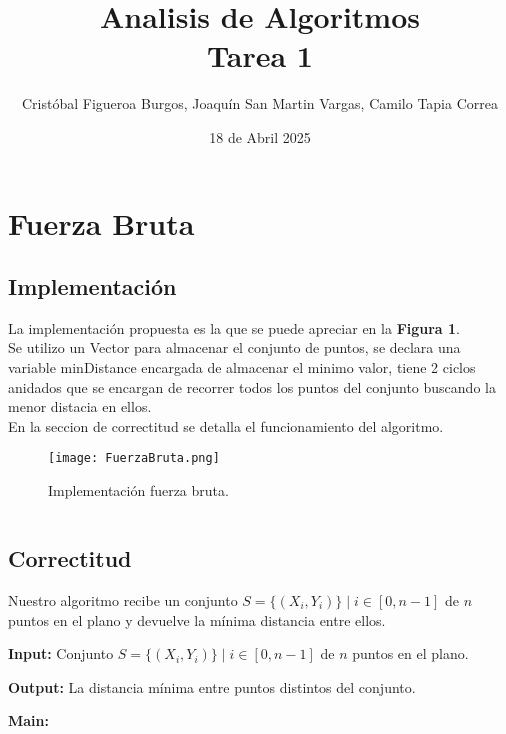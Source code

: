 \documentclass{article}
\title{Analisis de Algoritmos \\ Tarea 1}
\date{18 de Abril 2025}
\author{Cristóbal Figueroa Burgos, Joaquín San Martin Vargas, Camilo Tapia Correa}
\begin{document}
\maketitle


\section{Fuerza Bruta}

\subsection{Implementación}
  La implementación propuesta es la que se puede apreciar en la \textbf{Figura 1}.\\
  Se utilizo un Vector para almacenar el conjunto de puntos, se declara una variable minDistance encargada de almacenar el minimo valor, tiene 2 ciclos anidados que se encargan de recorrer todos los puntos del conjunto buscando la menor distacia en ellos.\\ En la seccion de correctitud se detalla el funcionamiento del algoritmo.
  \begin{figure}[H] %
    \centering
    \texttt{[image: FuerzaBruta.png]} %
    \caption{Implementación fuerza bruta.}
    \label{fig:etiqueta_imagen}
\end{figure}
\begin{lstlisting}
\end{lstlisting}

\subsection{Correctitud}
Nuestro algoritmo recibe un conjunto $S = \{(X_i, Y_i)\} \mid i \in [0, n-1]$ de $n$ puntos en el plano y devuelve la mínima distancia entre ellos.

\vspace{1em}

\textbf{Input:} Conjunto $S = \{(X_i, Y_i)\} \mid i \in [0, n-1]$ de $n$ puntos en el plano.

\textbf{Output:} La distancia mínima entre puntos distintos del conjunto.

\vspace{1em}

\textbf{Main:}
\end{document}
